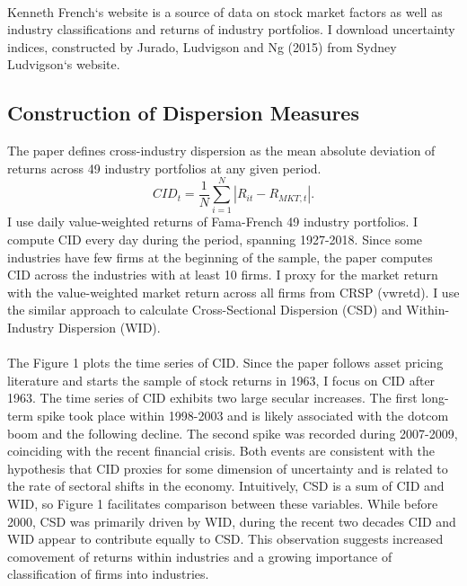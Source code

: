 \documentclass[12pt]{article}
\begin{document}
\paragraph{}
Kenneth French`s website is a source of data on stock market factors as well as industry classifications and returns of industry portfolios. I download uncertainty indices, constructed by Jurado, Ludvigson and Ng (2015) from Sydney Ludvigson`s website. 

\subsection{Construction of Dispersion Measures}

The paper defines cross-industry dispersion as the mean absolute deviation of returns across 49 industry portfolios at any given period.
\begin{equation}
CID_t = \frac{1}{N}\sum^{N}_{i=1}{|R_{it}-R_{MKT,t}|}.
\end{equation}
I use daily value-weighted returns of Fama-French 49 industry portfolios. I compute CID every day during the period, spanning 1927-2018. Since some industries have few firms at the beginning of the sample, the paper computes CID across the industries with at least 10 firms. I proxy for the market return with the value-weighted market return across all firms from CRSP (vwretd). I use the similar approach to calculate Cross-Sectional Dispersion (CSD) and Within-Industry Dispersion (WID).
\paragraph{}
The Figure 1 plots the time series of CID. Since the paper follows asset pricing literature and starts the sample of stock returns in 1963, I focus on CID after 1963. The time series of CID exhibits two large secular increases. The first long-term spike took place within 1998-2003 and is likely associated with the dotcom boom and the following decline. The second spike was recorded during 2007-2009, coinciding with the recent financial crisis. Both events are consistent with the hypothesis that CID proxies for some dimension of uncertainty and is related to the rate of sectoral shifts in the economy. Intuitively, CSD is a sum of CID and WID, so Figure 1 facilitates comparison between these variables. While before 2000, CSD was primarily driven by WID, during the recent two decades CID and WID appear to contribute equally to CSD. This observation suggests increased comovement of returns within industries and a growing importance of classification of firms into industries.
\end{document}
